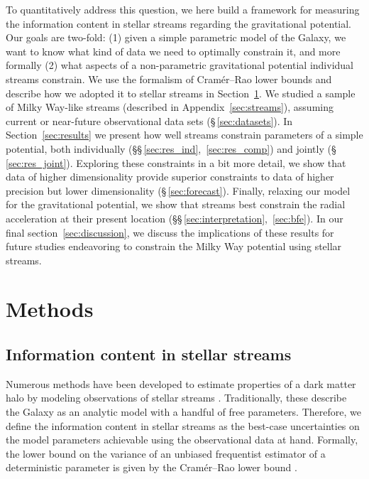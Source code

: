 \documentclass[modern]{aastex61}
\newcommand{\acronym}[1]{{\small{#1}}}
\newcommand{\CRLB}{\acronym{CRLB}}
\begin{document}
To quantitatively address this question, we here build a framework for measuring the information content in stellar streams regarding the gravitational potential.
Our goals are two-fold: (1) given a simple parametric model of the Galaxy, we want to know what kind of data we need to optimally constrain it, and more formally (2) what aspects of a non-parametric gravitational potential individual streams constrain.
We use the formalism of Cram\'er--Rao lower bounds and describe how we adopted it to stellar streams in Section~\ref{sec:method}.
We studied a sample of Milky Way-like streams (described in Appendix~\ref{sec:streams}), assuming current or near-future observational data sets (\S\,\ref{sec:datasets}).
In Section~\ref{sec:results} we present how well streams constrain parameters of a simple potential, both individually (\S\S\,\ref{sec:res_ind},~\ref{sec:res_comp}) and jointly (\S\,\ref{sec:res_joint}).
Exploring these constraints in a bit more detail, we show that data of higher dimensionality provide superior constraints to data of higher precision but lower dimensionality (\S\,\ref{sec:forecast}).
Finally, relaxing our model for the gravitational potential, we show that streams best constrain the radial acceleration at their present location (\S\S\,\ref{sec:interpretation},~\ref{sec:bfe}).
In our final section~\ref{sec:discussion}, we discuss the implications of these results for future studies endeavoring to constrain the Milky Way potential using stellar streams.


\section{Methods}
\label{sec:method}

\subsection{Information content in stellar streams}
Numerous methods have been developed to estimate properties of a dark matter halo by modeling observations of stellar streams \citep[e.g.,][]{varghese2011,sanders2013,bonaca2014,bovy2014,apw2014}.
Traditionally, these describe the Galaxy as an analytic model with a handful of free parameters.
Therefore, we define the information content in stellar streams as the best-case uncertainties on the model parameters achievable using the observational data at hand.
Formally, the lower bound on the variance of an unbiased frequentist estimator of a deterministic parameter is given by the Cram\' er--Rao lower bound \citep[\CRLB,][]{Cramer1946, Rao1945}.
\end{document}
